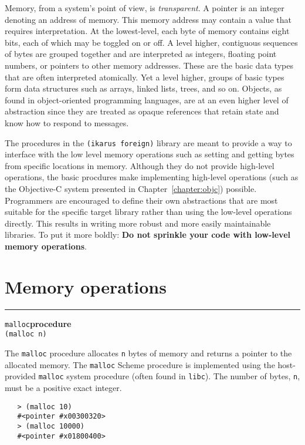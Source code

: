 \documentclass[onecolumn, 12pt, twoside, openright, dvipdfm]{book}
\makeatletter
\newcommand{\idxlabeldefun}[5]{
\vspace{1ex}
\rule{\textwidth}{2pt}
{\phantomsection\index{#1@\texttt{#2}}\label{#3}{\Large\texttt{#4}}\hfill\textbf{#5}}\\}
\newcommand{\idxdefun}[3]{\idxlabeldefun{#1}{#2}{#1}{#2}{#3}}
\newcommand{\defun}[2]{\idxdefun{#1}{#1}{#2}}
\makeatother
\begin{document}
Memory, from a system's point of view, is \emph{transparent}.  A
pointer is an integer denoting an address of memory.  This memory
address may contain a value that requires interpretation.  At the
lowest-level, each byte of memory contains eight bits, each of which
may be toggled on or off.  A level higher, contiguous sequences of
bytes are grouped together and are interpreted as integers, floating
point numbers, or pointers to other memory addresses.  These are the
basic data types that are often interpreted atomically.  Yet a level
higher, groups of basic types form data structures such as arrays,
linked lists, trees, and so on.  Objects, as found in
object-oriented programming languages, are at an even higher level
of abstraction since they are treated as opaque references that
retain state and know how to respond to messages.

The procedures in the \texttt{(ikarus~foreign)} library are meant to
provide a way to interface with the low level memory operations such
as setting and getting bytes from specific locations in memory.
Although they do not provide high-level operations, the basic
procdures make implementing high-level operations (such as the
Objective-C system presented in Chapter~\ref{chapter:objc})
possible.  Programmers are encouraged to define their own
abstractions that are most suitable for the specific target library
rather than using the low-level operations directly.  This results
in writing more robust and more easily maintainable libraries.  To
put it more boldly: \textbf{Do not sprinkle your code with low-level
memory operations}.


\section{\label{sec:ffi-memory}Memory operations}

\defun{malloc}{procedure}
\texttt{(malloc n)}

The \texttt{malloc} procedure allocates \texttt{n} bytes of memory
and returns a pointer to the allocated memory.  The \texttt{malloc}
Scheme procedure is implemented using the host-provided
\texttt{malloc} system procedure (often found in \texttt{libc}).
The number of bytes, \texttt{n}, must be a positive exact integer.  

\begin{verbatim}
   > (malloc 10)
   #<pointer #x00300320>
   > (malloc 10000)
   #<pointer #x01800400>
\end{verbatim}
\end{document}
